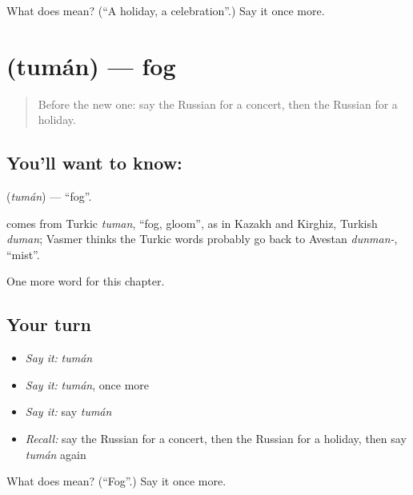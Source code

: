 \begin{tcolorbox}[breakable,colback=teal!4,colframe=teal!35!black,title={Before you move on}]
What does  mean? (\textquotedblleft{}A holiday, a celebration\textquotedblright{}.) Say it once more.
\end{tcolorbox}
\section[\texorpdfstring{\ru{туман} (tumán)}{туман (tumán)}]{ (tumán) — fog}

\label{lesson:RU-C114-fog}



\begin{quote}
Before the new one: say the Russian for a concert, then the Russian for a holiday.
\end{quote}

\subsection*{You'll want to know: }
\textbf{} (\emph{tumán}) — \textquotedblleft{}fog\textquotedblright{}.

\begin{cousinweb}
\textbf{} comes from Turkic \emph{tuman}, \textquotedblleft{}fog, gloom\textquotedblright{}, as in Kazakh and Kirghiz, Turkish \emph{duman}; Vasmer thinks the Turkic words probably go back to Avestan \emph{dunman-}, \textquotedblleft{}mist\textquotedblright{}.
\end{cousinweb}

\begin{grammarlens}[title={What you've built}]
One more word for this chapter.
\end{grammarlens}

\subsection*{Your turn}
\begin{itemize}
\raggedright
  \item \emph{Say it:} \emph{tumán}
  \item \emph{Say it:} \emph{tumán}, once more
  \item \emph{Say it:} say \emph{tumán}
  \item \emph{Recall:} say the Russian for a concert, then the Russian for a holiday, then say \emph{tumán} again
\end{itemize}

\begin{tcolorbox}[breakable,colback=teal!4,colframe=teal!35!black,title={Before you move on}]
What does  mean? (\textquotedblleft{}Fog\textquotedblright{}.) Say it once more.
\end{tcolorbox}
